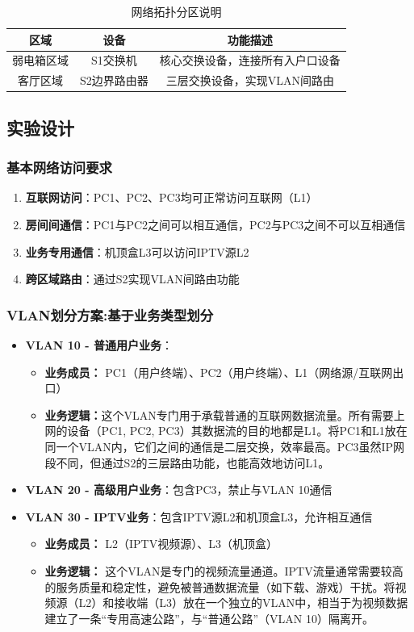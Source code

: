 \documentclass[a4paper]{article}
\begin{document}
\begin{table}[H]
\centering
\begin{tabular}{|c|c|c|}
\hline
\textbf{区域} & \textbf{设备} & \textbf{功能描述} \\
\hline
弱电箱区域 & S1交换机 & 核心交换设备，连接所有入户口设备 \\
\hline
客厅区域 & S2边界路由器 & 三层交换设备，实现VLAN间路由 \\
\hline
\end{tabular}
\caption{网络拓扑分区说明}
\end{table}

\subsection{实验设计}
\subsubsection{基本网络访问要求}
\begin{enumerate}
    \item \textbf{互联网访问}：PC1、PC2、PC3均可正常访问互联网（L1）
    \item \textbf{房间间通信}：PC1与PC2之间可以相互通信，PC2与PC3之间不可以互相通信
    \item \textbf{业务专用通信}：机顶盒L3可以访问IPTV源L2
    \item \textbf{跨区域路由}：通过S2实现VLAN间路由功能
\end{enumerate}

\subsubsection{VLAN划分方案:基于业务类型划分}
\begin{itemize}
    \item \textbf{VLAN 10 - 普通用户业务}：
    \begin{itemize}
        \item \textbf{业务成员：} PC1（用户终端）、PC2（用户终端）、L1（网络源/互联网出口）
        \item \textbf{业务逻辑：}这个VLAN专门用于承载普通的互联网数据流量。所有需要上网的设备（PC1, PC2, PC3）其数据流的目的地都是L1。将PC1和L1放在同一个VLAN内，它们之间的通信是二层交换，效率最高。PC3虽然IP网段不同，但通过S2的三层路由功能，也能高效地访问L1。
    \end{itemize}
    \item \textbf{VLAN 20 - 高级用户业务}：包含PC3，禁止与VLAN 10通信
    \item \textbf{VLAN 30 - IPTV业务}：包含IPTV源L2和机顶盒L3，允许相互通信 
    \begin{itemize}
        \item \textbf{业务成员：} L2（IPTV视频源）、L3（机顶盒）
        \item \textbf{业务逻辑：} 这个VLAN是专门的视频流量通道。IPTV流量通常需要较高的服务质量和稳定性，避免被普通数据流量（如下载、游戏）干扰。将视频源（L2）和接收端（L3）放在一个独立的VLAN中，相当于为视频数据建立了一条“专用高速公路”，与“普通公路”（VLAN 10）隔离开。
    \end{itemize}
\end{itemize}
\end{document}
